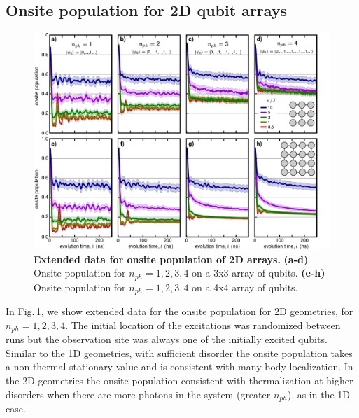 \subsection{Onsite population for 2D qubit arrays}
\begin{figure}[tbh]
\centering
\includegraphics[width=175mm, keepaspectratio]{./PDF/population_2d_190915_1018a.pdf}
\caption{\textbf{Extended data for onsite population of 2D arrays.}
\textbf{(a-d)} Onsite population for $n_{ph} = 1,2,3,4$ on a 3x3 array of qubits.
\textbf{(e-h)} Onsite population for $n_{ph} = 1,2,3,4$ on a 4x4 array of qubits.}
    \label{extended_data_2d_transport}
\end{figure}

In Fig.\,\ref{extended_data_2d_transport}, we show extended data for the onsite population for 2D geometries, for $n_{ph}=1,2,3,4$.  The initial location of the excitations was randomized between runs but the observation site was always one of the initially excited qubits.  Similar to the 1D geometries, with sufficient disorder the onsite population takes a non-thermal stationary value and is consistent with many-body localization.  In the 2D geometries the onsite population consistent with thermalization at higher disorders when there are more photons in the system (greater $n_{ph}$), as in the 1D case.

